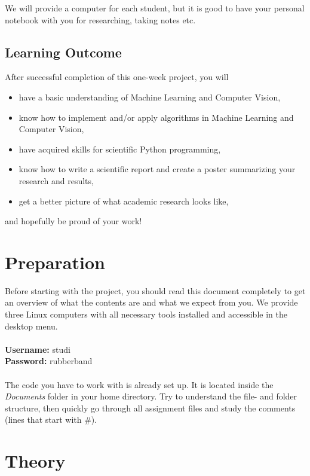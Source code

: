 \documentclass[a4paper]{article}
\begin{document}
		We will provide a computer for each student, but it is good to have your personal notebook with you for researching, taking notes etc.
	
	\subsection{Learning Outcome}
		After successful completion of this one-week project, you will  %
		\begin{itemize}
			\item have a basic understanding of Machine Learning and Computer Vision,
			\item know how to implement and/or apply algorithms in Machine Learning and Computer Vision,
			\item have acquired skills for scientific Python programming,
			\item know how to write a scientific report and create a poster summarizing your research and results,
			\item get a better picture of what academic research looks like,
		\end{itemize}
		and hopefully be proud of your work!
	

\section{Preparation}
	Before starting with the project, you should read this document completely to get an overview of what the contents are and what we expect from you.
	We provide three Linux computers with all necessary tools installed and accessible in the desktop menu. 
	\\ \\
	\textbf{Username:} studi\\
	\textbf{Password:} rubberband
	\\ \\
	The code you have to work with is already set up.
	It is located inside the \emph{Documents} folder in your home directory. 
	Try to understand the file- and folder structure, then quickly go through all assignment files and study the comments (lines that start with \#).

	
\section{Theory}
\end{document}
